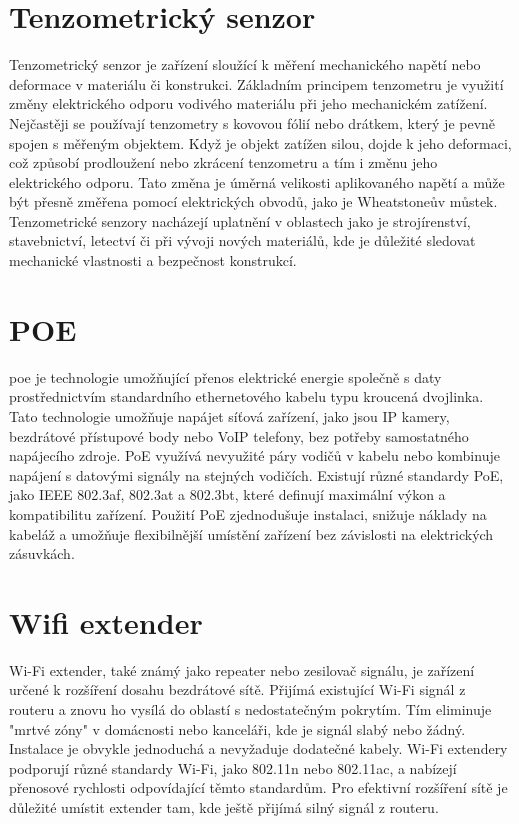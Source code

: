 \section{Tenzometrický senzor}\label{sec:tenzor}
Tenzometrický senzor je zařízení sloužící k měření mechanického napětí nebo deformace v materiálu či konstrukci. Základním principem tenzometru je využití změny elektrického odporu vodivého materiálu při jeho mechanickém zatížení. Nejčastěji se používají tenzometry s kovovou fólií nebo drátkem, který je pevně spojen s měřeným objektem. Když je objekt zatížen silou, dojde k jeho deformaci, což způsobí prodloužení nebo zkrácení tenzometru a tím i změnu jeho elektrického odporu. Tato změna je úměrná velikosti aplikovaného napětí a může být přesně změřena pomocí elektrických obvodů, jako je Wheatstoneův můstek. Tenzometrické senzory nacházejí uplatnění v oblastech jako je strojírenství, stavebnictví, letectví či při vývoji nových materiálů, kde je důležité sledovat mechanické vlastnosti a bezpečnost konstrukcí.

\section{POE}\label{sec:poe}
\gls{poe}  je technologie umožňující přenos elektrické energie společně s daty prostřednictvím standardního ethernetového kabelu typu kroucená dvojlinka. Tato technologie umožňuje napájet síťová zařízení, jako jsou IP kamery, bezdrátové přístupové body nebo VoIP telefony, bez potřeby samostatného napájecího zdroje. PoE využívá nevyužité páry vodičů v kabelu nebo kombinuje napájení s datovými signály na stejných vodičích. Existují různé standardy PoE, jako IEEE 802.3af, 802.3at a 802.3bt, které definují maximální výkon a kompatibilitu zařízení. Použití PoE zjednodušuje instalaci, snižuje náklady na kabeláž a umožňuje flexibilnější umístění zařízení bez závislosti na elektrických zásuvkách.

\section{Wifi extender}\label{sec:wifi-extender}
Wi-Fi extender, také známý jako repeater nebo zesilovač signálu, je zařízení určené k rozšíření dosahu bezdrátové sítě. Přijímá existující Wi-Fi signál z routeru a znovu ho vysílá do oblastí s nedostatečným pokrytím. Tím eliminuje "mrtvé zóny" v domácnosti nebo kanceláři, kde je signál slabý nebo žádný. Instalace je obvykle jednoduchá a nevyžaduje dodatečné kabely. Wi-Fi extendery podporují různé standardy Wi-Fi, jako 802.11n nebo 802.11ac, a nabízejí přenosové rychlosti odpovídající těmto standardům. Pro efektivní rozšíření sítě je důležité umístit extender tam, kde ještě přijímá silný signál z routeru.

